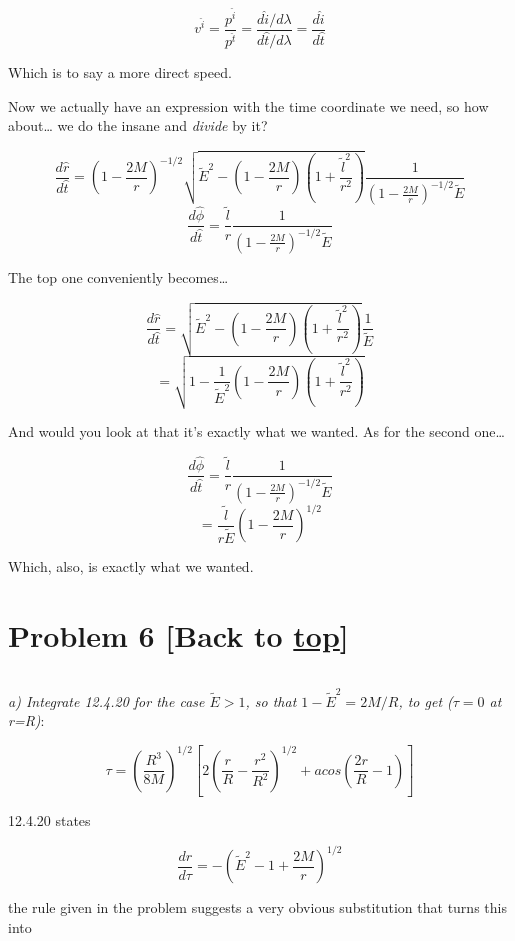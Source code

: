 \documentclass[landscape,letterpaper,10pt,english]{article}
\begin{document}
\[v^{\hat i} = \frac{p^{\hat i}}{p^\hat t} = \frac{d\hat i/d\lambda}{d\hat t/d\lambda} = \frac{d\hat i}{d\hat t}\]

Which is to say a more direct speed.

    Now we actually have an expression with the time coordinate we need, so
how about\ldots{} we do the insane and \emph{divide} by it?

\[ \frac{d\hat r}{d \hat t}  = \left( 1-\frac{2M}{r} \right)^{-1/2} \sqrt{\tilde E^2 - \left( 1-\frac{2M}{r} \right) \left( 1+\frac{\tilde l^2}{r^2} \right)} \frac{1}{\left( 1-\frac{2M}{r} \right)^{-1/2} \tilde E} \]
\[ \frac{d\hat \phi}{d \hat t}  = \frac{\tilde l}{r} \frac{1}{\left( 1-\frac{2M}{r} \right)^{-1/2} \tilde E}\]

    The top one conveniently becomes\ldots{}

\[ \frac{d\hat r}{d \hat t}  = \sqrt{\tilde E^2 - \left( 1-\frac{2M}{r} \right) \left( 1+\frac{\tilde l^2}{r^2} \right)} \frac{1}{\tilde E} \]
\[  = \sqrt{1 - \frac{1}{\tilde E^2}\left( 1-\frac{2M}{r} \right) \left( 1+\frac{\tilde l^2}{r^2} \right)} \]

And would you look at that it's exactly what we wanted. As for the
second one\ldots{}

    \[ \frac{d\hat \phi}{d \hat t}  = \frac{\tilde l}{r} \frac{1}{\left( 1-\frac{2M}{r} \right)^{-1/2} \tilde E}\]
\[  = \frac{\tilde l}{r \tilde E}\left(1-\frac{2M}{r} \right)^{1/2} \]

Which, also, is exactly what we wanted.

    \hypertarget{problem-6-back-to-top}{%
\section{\texorpdfstring{Problem 6 {[}Back to
\hyperref[toc]{top}{]}}{Problem 6 {[}Back to {]}}}\label{problem-6-back-to-top}}

\[\label{P6}\]

\emph{a) Integrate 12.4.20 for the case \(\tilde E > 1\), so that
\(1 - \tilde E^2 = 2M/R\), to get (\(\tau=0\) at r=R)}:

\[ \tau = \left( \frac{R^3}{8M} \right)^{1/2} \left[ 2 \left( \frac{r}{R} - \frac{r^2}{R^2} \right)^{1/2} + acos \left( \frac{2r}{R} - 1 \right) \right] \]

    12.4.20 states

\[ \frac{dr}{d\tau} = -\left( \tilde E^2 - 1 + \frac{2M}{r} \right)^{1/2} \]

the rule given in the problem suggests a very obvious substitution that
turns this into
\end{document}

